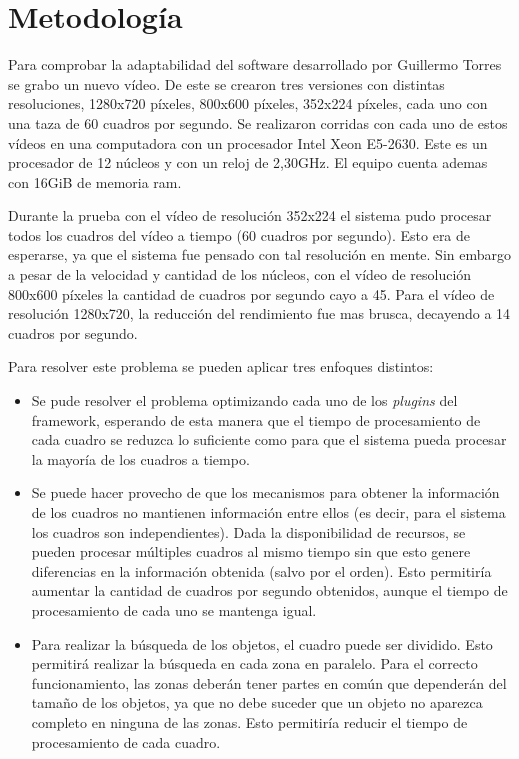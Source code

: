 
\section{Metodología}

Para comprobar la adaptabilidad del software desarrollado por Guillermo Torres
se grabo un nuevo vídeo. De este se crearon tres versiones con distintas
resoluciones, 1280x720 píxeles, 800x600 píxeles, 352x224 píxeles, cada uno con
una taza de 60 cuadros por segundo. Se realizaron corridas con cada uno de estos
vídeos en una computadora con un procesador Intel Xeon E5-2630. Este es un
procesador de 12 núcleos y con un reloj de 2,30GHz. El equipo cuenta ademas con
16GiB de memoria ram.

Durante la prueba con el vídeo de resolución 352x224 el sistema pudo procesar
todos los cuadros del vídeo a tiempo (60 cuadros por segundo). Esto era de
esperarse, ya que el sistema fue pensado con tal resolución en mente. Sin
embargo a pesar de la velocidad y cantidad de los núcleos, con el vídeo de
resolución 800x600 píxeles la cantidad de cuadros por segundo cayo a 45. Para el
vídeo de resolución 1280x720, la reducción del rendimiento fue mas brusca,
decayendo a 14 cuadros por segundo.

Para resolver este problema se pueden aplicar tres enfoques distintos:

\begin{itemize}

\item	Se pude resolver el problema optimizando cada uno de los \emph{plugins}
	del framework, esperando de esta manera que el tiempo de procesamiento
	de cada cuadro se reduzca lo suficiente como para que el sistema pueda
	procesar la mayoría de los cuadros a tiempo.

\item	Se puede hacer provecho de que los mecanismos para obtener la
	información de los cuadros no mantienen información entre ellos (es
	decir, para el sistema los cuadros son independientes). Dada la
	disponibilidad de recursos, se pueden procesar múltiples cuadros al
	mismo tiempo sin que esto genere diferencias en la información obtenida
	(salvo por el orden). Esto permitiría aumentar la cantidad de cuadros
	por segundo obtenidos, aunque el tiempo de procesamiento de cada uno se
	mantenga igual.

\item	Para realizar la búsqueda de los objetos, el cuadro puede ser dividido.
	Esto permitirá realizar la búsqueda en cada zona en paralelo. Para el
	correcto funcionamiento, las zonas deberán tener partes en común que
	dependerán del tamaño de los objetos, ya que no debe suceder que un
	objeto no aparezca completo en ninguna de las zonas. Esto permitiría
	reducir el tiempo de procesamiento de cada cuadro.

\end{itemize}

